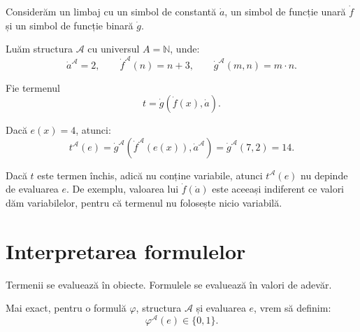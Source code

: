 \begin{eg}
	Considerăm un limbaj cu un simbol de constantă \( \dot{a} \), un simbol de funcție unară \( \dot{f} \) și un simbol de funcție binară \( \dot{g} \).

	Luăm structura \( \mathcal{A} \) cu universul \(A = \mathbb{N}\), unde:
	\[
		\dot{a}^{\mathcal{A}} = 2, \qquad
		\dot{f}^{\mathcal{A}}(n) = n + 3, \qquad
		\dot{g}^{\mathcal{A}}(m,n) = m \cdot n.
	\]

	Fie termenul
	\[
		t = \dot{g}(\dot{f}(x), \dot{a}).
	\]

	Dacă \(e(x)=4\), atunci:
	\[
		t^\mathcal{A}(e)
		= \dot{g}^{\mathcal{A}}\left(\dot{f}^{\mathcal{A}}(e(x)), \dot{a}^{\mathcal{A}}\right)
		= \dot{g}^{\mathcal{A}}(7,2)
		= 14.
	\]
\end{eg}

\begin{note}
	Dacă \(t\) este termen închis, adică nu conține variabile, atunci \(t^\mathcal{A}(e)\) nu depinde de evaluarea \(e\). De exemplu, valoarea lui
	\(\dot{f}(\dot{a})\) este aceeași indiferent ce valori dăm variabilelor, pentru că termenul nu folosește nicio variabilă.
\end{note}

\section{Interpretarea formulelor}

Termenii se evaluează în obiecte. Formulele se evaluează în valori de adevăr.

Mai exact, pentru o formulă \( \varphi \), structura \( \mathcal{A} \) și evaluarea \(e\), vrem să definim:
\[
	\varphi^\mathcal{A}(e) \in \{0,1\}.
\]

